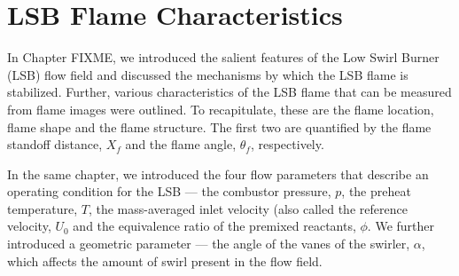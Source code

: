 \chapter{LSB Flame Characteristics}







In Chapter FIXME, we introduced the salient features of the Low Swirl Burner (LSB) flow field and discussed the mechanisms by which the LSB flame is stabilized.
Further, various characteristics of the LSB flame that can be measured from flame images were outlined.
To recapitulate, these are the flame location, flame shape and the flame structure.
The first two are quantified by the flame standoff distance, \(X_f\) and the flame angle, \(\theta_f\), respectively.

In the same chapter, we introduced the four flow parameters that describe an operating condition for the LSB --- the combustor pressure, \(p\), the preheat temperature, \(T\), the mass-averaged inlet velocity (also called the reference velocity, \(U_0\) and the equivalence ratio of the premixed reactants, \(\phi\).
We further introduced a geometric parameter --- the angle of the vanes of the swirler, \(\alpha\), which affects the amount of swirl present in the flow field.

